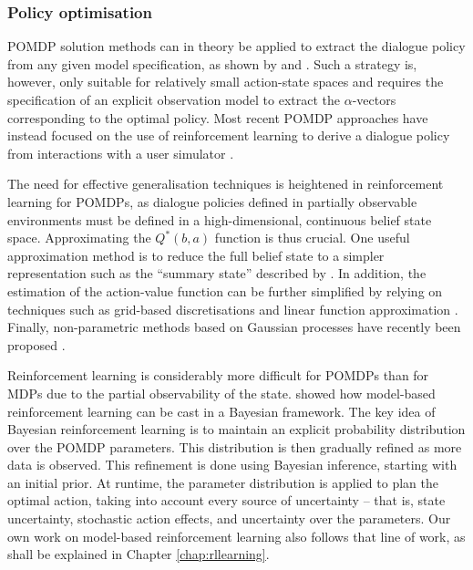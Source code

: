 \subsubsection*{Policy optimisation}

POMDP solution methods can in theory be applied to extract the dialogue policy from any given model specification, as shown by \cite{Williams:2007} and \cite{Williamsetal:2008}.  Such a strategy is, however, only suitable for relatively small action-state spaces and requires the specification of an explicit observation model to extract the $\alpha$-vectors corresponding to the optimal policy. Most recent POMDP approaches have instead focused on the use of reinforcement learning to derive a dialogue policy from interactions with a user simulator \citep{Young:2010,Thomson:2010:BUD:1772996.1773040, daubigney2012}.

The need for effective generalisation techniques is heightened in reinforcement learning for POMDPs, as dialogue policies defined in partially observable environments must be defined in a high-dimensional, continuous belief state space.  Approximating the $Q^*(b,a)$ function is thus crucial. One useful approximation method is to reduce the full belief state to a simpler representation such as the ``summary state'' described by \cite{williams2005}. In addition, the estimation of the action-value function can be further simplified by relying on techniques such as grid-based discretisations \citep{Young:2010} and linear function approximation  \citep{Thomson:2010:BUD:1772996.1773040, daubigney2012}. Finally, non-parametric methods based on Gaussian processes have recently been proposed \citep{gasic2011,milica2013}. 

Reinforcement learning is considerably more difficult for POMDPs than for MDPs due to the partial observability of the state.  \cite{5946754} showed how model-based reinforcement learning can be cast in a Bayesian framework. The key idea of Bayesian reinforcement learning is to maintain an explicit probability distribution over the POMDP parameters. This distribution is then gradually refined as more data is observed. This refinement is done using Bayesian inference, starting with an initial prior.  At runtime, the parameter distribution is applied to plan the optimal action, taking into account every source of uncertainty -- that is, state uncertainty, stochastic action effects, and uncertainty over the parameters.  Our own work on model-based reinforcement learning also follows that line of work, as shall be explained in Chapter \ref{chap:rllearning}. 

